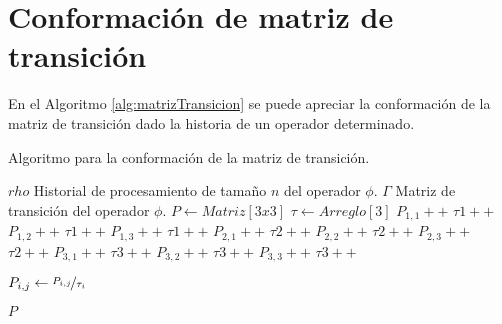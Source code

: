 \chapter{Conformaci\'on de matriz de transici\'on}
\label{apendice:matrizTransicion}

En el Algoritmo \ref{alg:matrizTransicion} se puede apreciar la conformaci\'on de la matriz de transici\'on dado la historia de un operador determinado.

\begin{algorithm}[!hb]
	\caption{Algoritmo para la conformaci\'on de la matriz de transici\'on.}
	\label{alg:matrizTransicion}
	\begin{algorithmic}[1]
	\REQUIRE $rho$ Historial de procesamiento de tama\~no $n$ del operador $\phi$.
	\ENSURE $\Gamma$ Matriz de transici\'on del operador $\phi$.
	\STATE $P \leftarrow Matriz[3x3]$ 
	\STATE $\tau \leftarrow Arreglo[3]$ 
			\STATE $P_{1,1}++$
			\STATE $\tau{1}++$
			\STATE $P_{1,2}++$
			\STATE $\tau{1}++$
			\STATE $P_{1,3}++$
			\STATE $\tau{1}++$
			\STATE $P_{2,1}++$
			\STATE $\tau{2}++$
			\STATE $P_{2,2}++$
			\STATE $\tau{2}++$
			\STATE $P_{2,3}++$
			\STATE $\tau{2}++$
			\STATE $P_{3,1}++$
			\STATE $\tau{3}++$
			\STATE $P_{3,2}++$
			\STATE $\tau{3}++$
		\ELSE
			\STATE $P_{3,3}++$
			\STATE $\tau{3}++$
		\ENDIF	
	\ENDFOR

				\STATE $P_{i,j} \leftarrow \nicefrac{P_{i,j}}{\tau_{i}}$
			\ENDFOR
		\ENDIF
	\ENDFOR
	
	\RETURN $P$ 
	\end{algorithmic}
\end{algorithm}